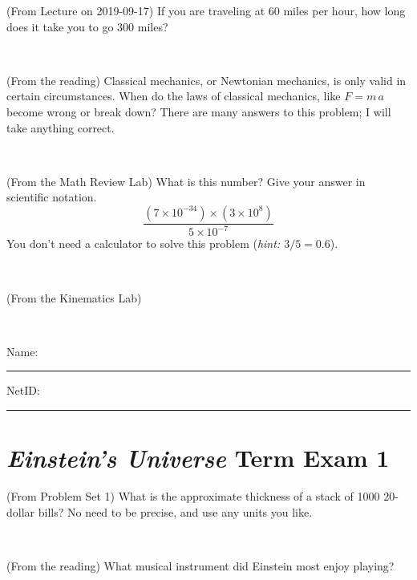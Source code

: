 \documentclass[12pt, letterpaper]{article}
\begin{document}
\begin{problem} (From Lecture on 2019-09-17)
If you are traveling at 60 miles per hour, how long does
it take you to go 300 miles?
\end{problem}


\vfill ~

\begin{problem} (From the reading)
Classical mechanics, or Newtonian mechanics, is only valid in certain
circumstances. When do the laws of classical mechanics, like $F =
m\,a$ become wrong or break down? There are many answers to this
problem; I will take anything correct.
\end{problem}


\vfill ~

\begin{problem} (From the Math Review Lab)
What is this number? Give your answer in scientific notation.
$$
\frac{(7\times10^{-34})\times(3\times10^8)}{5\times10^{-7}}
$$
You don't need a calculator to solve this problem (\textit{hint: $3/5=0.6$}).
\end{problem}


\vfill ~

\begin{problem} (From the Kinematics Lab)

\end{problem}


\vfill ~


\cleardoublepage



\noindent
Name: \rule[-1ex]{0.60\textwidth}{0.1pt}
NetID: \rule[-1ex]{0.20\textwidth}{0.1pt}

\section*{\textsl{Einstein's Universe} Term Exam 1}
\setcounter{problem}{1}


\begin{problem} (From Problem Set 1)
What is the approximate thickness of a stack of 1000 20-dollar bills?
No need to be precise, and use any units you like.
\end{problem}


\vfill ~

\begin{problem} (From the reading)
What musical instrument did Einstein most enjoy playing?
\end{problem}


\vfill ~
\end{document}
